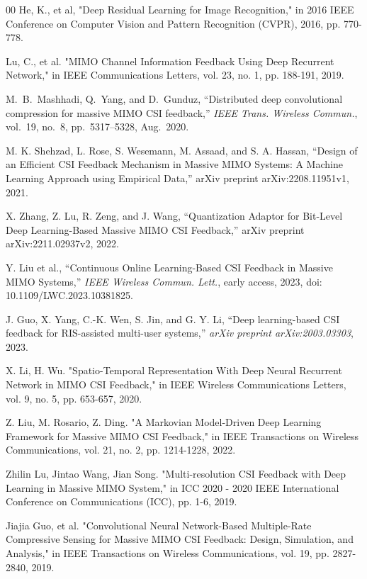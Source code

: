 \documentclass[lettersize,journal]{IEEEtran}
\begin{document}
\begin{thebibliography}{00}
    He, K., et al, "Deep Residual Learning for Image Recognition," in 2016 IEEE Conference on Computer Vision and Pattern Recognition (CVPR), 2016, pp. 770-778.


    Lu, C., et al. "MIMO Channel Information Feedback Using Deep Recurrent Network," in IEEE Communications Letters, vol. 23, no. 1, pp. 188-191, 2019.

    M.~B.~Mashhadi, Q.~Yang, and D.~Gunduz, ``Distributed deep convolutional compression for massive MIMO CSI feedback,'' \textit{IEEE Trans. Wireless Commun.}, vol.~19, no.~8, pp.~5317--5328, Aug.~2020.

    M. K. Shehzad, L. Rose, S. Wesemann, M. Assaad, and S. A. Hassan, ``Design of an Efficient CSI Feedback Mechanism in Massive MIMO Systems: A Machine Learning Approach using Empirical Data,'' arXiv preprint arXiv:2208.11951v1, 2021.

    X. Zhang, Z. Lu, R. Zeng, and J. Wang, ``Quantization Adaptor for Bit-Level Deep Learning-Based Massive MIMO CSI Feedback,'' arXiv preprint arXiv:2211.02937v2, 2022.

    Y. Liu et al., ``Continuous Online Learning-Based CSI Feedback in Massive MIMO Systems,'' \textit{IEEE Wireless Commun. Lett.}, early access, 2023, doi: 10.1109/LWC.2023.10381825.

    J. Guo, X. Yang, C.-K. Wen, S. Jin, and G. Y. Li, ``Deep learning-based CSI feedback for RIS-assisted multi-user systems,'' \textit{arXiv preprint arXiv:2003.03303}, 2023.

    X. Li, H. Wu. "Spatio-Temporal Representation With Deep Neural Recurrent Network in MIMO CSI Feedback," in IEEE Wireless Communications Letters, vol. 9, no. 5, pp. 653-657, 2020.

    Z. Liu, M. Rosario, Z. Ding. "A Markovian Model-Driven Deep Learning Framework for Massive MIMO CSI Feedback," in IEEE Transactions on Wireless Communications, vol. 21, no. 2, pp. 1214-1228, 2022.

    Zhilin Lu, Jintao Wang, Jian Song. "Multi-resolution CSI Feedback with Deep Learning in Massive MIMO System," in ICC 2020 - 2020 IEEE International Conference on Communications (ICC), pp. 1-6, 2019.

    Jiajia Guo, et al. "Convolutional Neural Network-Based Multiple-Rate Compressive Sensing for Massive MIMO CSI Feedback: Design, Simulation, and Analysis," in IEEE Transactions on Wireless Communications, vol. 19, pp. 2827-2840, 2019.


\end{thebibliography}
\end{document}
